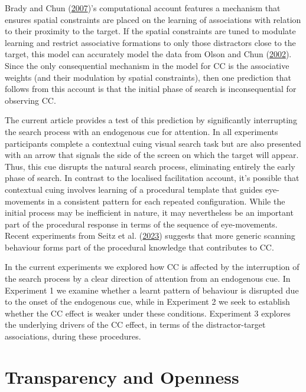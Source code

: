 \documentclass[
  man,
  floatsintext,
  longtable,
  nolmodern,
  notxfonts,
  notimes,
  colorlinks=true,linkcolor=blue,citecolor=blue,urlcolor=blue]{apa7}
\begin{document}
Brady and Chun (\hyperref[ref-brady2007]{2007})'s computational account
features a mechanism that ensures spatial constraints are placed on the
learning of associations with relation to their proximity to the target.
If the spatial constraints are tuned to modulate learning and restrict
associative formations to only those distractors close to the target,
this model can accurately model the data from Olson and Chun
(\hyperref[ref-olson2002]{2002}). Since the only consequential mechanism
in the model for CC is the associative weights (and their modulation by
spatial constraints), then one prediction that follows from this account
is that the initial phase of search is inconsequential for observing CC.

The current article provides a test of this prediction by significantly
interrupting the search process with an endogenous cue for attention. In
all experiments participants complete a contextual cuing visual search
task but are also presented with an arrow that signals the side of the
screen on which the target will appear. Thus, this cue disrupts the
natural search process, eliminating entirely the early phase of search.
In contrast to the localised facilitation account, it's possible that
contextual cuing involves learning of a procedural template that guides
eye-movements in a consistent pattern for each repeated configuration.
While the initial process may be inefficient in nature, it may
nevertheless be an important part of the procedural response in terms of
the sequence of eye-movements. Recent experiments from Seitz et al.
(\hyperref[ref-seitz2023]{2023}) suggests that more generic scanning
behaviour forms part of the procedural knowledge that contributes to CC.

In the current experiments we explored how CC is affected by the
interruption of the search process by a clear direction of attention
from an endogenous cue. In Experiment 1 we examine whether a learnt
pattern of behaviour is disrupted due to the onset of the endogenous
cue, while in Experiment 2 we seek to establish whether the CC effect is
weaker under these conditions. Experiment 3 explores the underlying
drivers of the CC effect, in terms of the distractor-target
associations, during these procedures.

\section{Transparency and Openness}\label{transparency-and-openness}
\end{document}
